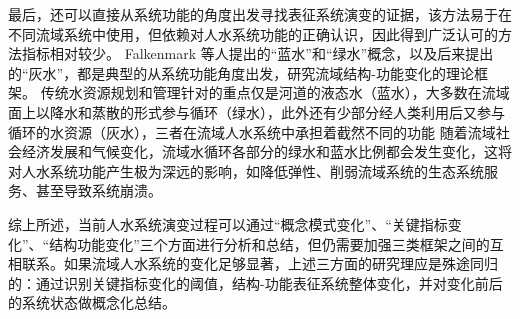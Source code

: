 最后，还可以直接从系统功能的角度出发寻找表征系统演变的证据，该方法易于在不同流域系统中使用，但依赖对人水系统功能的正确认识，因此得到广泛认可的方法指标相对较少。
Falkenmark 等人提出的“蓝水”和“绿水”概念\cite{falkenmark2006}，以及后来提出的“灰水”，都是典型的从系统功能角度出发，研究流域结构-功能变化的理论框架\cite{mekonnen2011}。
传统水资源规划和管理针对的重点仅是河道的液态水（蓝水），大多数在流域面上以降水和蒸散的形式参与循环（绿水），此外还有少部分经人类利用后又参与循环的水资源（灰水），三者在流域人水系统中承担着截然不同的功能\cite{craswell2007}
随着流域社会经济发展和气候变化，流域水循环各部分的绿水和蓝水比例都会发生变化，这将对人水系统功能产生极为深远的影响，如降低弹性、削弱流域系统的生态系统服务、甚至导致系统崩溃\cite{falkenmark2019}。

综上所述，当前人水系统演变过程可以通过“概念模式变化”、“关键指标变化”、“结构功能变化”三个方面进行分析和总结，但仍需要加强三类框架之间的互相联系。如果流域人水系统的变化足够显著，上述三方面的研究理应是殊途同归的：通过识别关键指标变化的阈值，结构-功能表征系统整体变化，并对变化前后的系统状态做概念化总结。
